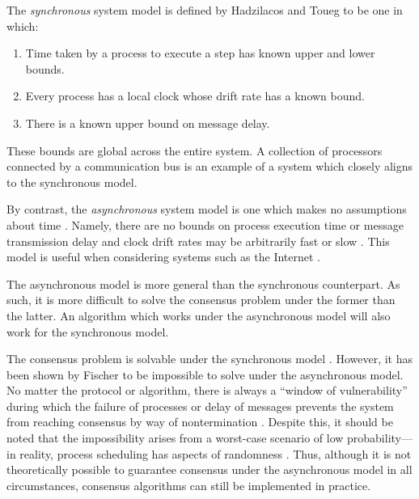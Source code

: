 \documentclass[12pt, a4paper]{article}
\begin{document}
The \textit{synchronous} system model is defined by Hadzilacos and Toueg \cite{hadzilacos1994modular} to be one in which:

\begin{enumerate}
  \item Time taken by a process to execute a step has known upper and lower
    bounds.
  \item Every process has a local clock whose drift rate has a known bound.
  \item There is a known upper bound on message delay.
\end{enumerate}

These bounds are global across the entire system. A collection of processors connected by a communication bus is an example of a system which closely aligns to the synchronous model.

By contrast, the \textit{asynchronous} system model is one which makes no assumptions about time \cite{coulouris2005distributed, hadzilacos1994modular}. Namely, there are no bounds on process execution time or message transmission delay and clock drift rates may be arbitrarily fast or slow \cite{coulouris2005distributed}. This model is useful when considering systems such as the Internet \cite{coulouris2005distributed}.

The asynchronous model is more general than the synchronous counterpart. As such, it is more difficult to solve the consensus problem under the former than the latter. An algorithm which works under the asynchronous model will also work for the synchronous model.

The consensus problem is solvable under the synchronous model \cite{fischer1985impossibility, kshemkalyani_singhal_2008}. However, it has been shown by Fischer \cite{fischer1985impossibility} to be impossible to solve under the asynchronous model. No matter the protocol or algorithm, there is always a ``window of vulnerability'' during which the failure of processes or delay of messages prevents the system from reaching consensus by way of nontermination \cite{fischer1985impossibility}. Despite this, it should be noted that the impossibility arises from a worst-case scenario of low probability---in reality, process scheduling has aspects of randomness \cite{aguilera2010stumbling}. Thus, although it is not theoretically possible to guarantee consensus under the asynchronous model in all circumstances, consensus algorithms can still be implemented in practice.
\end{document}
